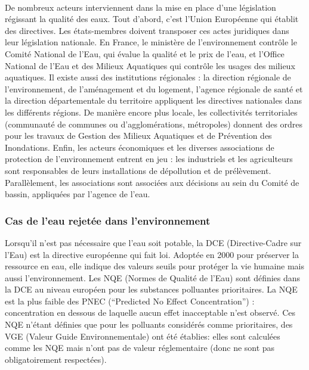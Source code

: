 \documentclass{article}
\begin{document}
\paragraph{} De nombreux acteurs interviennent dans la mise en place d’une législation régissant la qualité des eaux. Tout d’abord, c’est l’Union Européenne qui établit des directives. Les états-membres doivent transposer ces actes juridiques dans leur législation nationale. En France, le  ministère de l’environnement contrôle le Comité National de l’Eau, qui évalue la qualité et le prix de l’eau, et l’Office National de l’Eau et des Milieux Aquatiques  qui contrôle les usages des milieux aquatiques. Il existe aussi des institutions régionales : la direction régionale de l’environnement, de l’aménagement et du logement, l’agence régionale de santé et la direction départementale du territoire  appliquent les directives nationales dans les différents régions. De manière encore plus locale, les collectivités territoriales (communauté de communes ou d’agglomérations, métropoles) donnent des ordres pour les travaux de Gestion des Milieux Aquatiques et de Prévention des Inondations. Enfin, les acteurs économiques et les diverses associations de protection de l’environnement entrent en jeu : les industriels et les agriculteurs sont responsables de leurs installations de dépollution et de prélèvement. Parallèlement, les associations sont associées aux décisions au sein du Comité de bassin, appliquées par l’agence de l’eau.

\subsubsection{Cas de l’eau rejetée dans l’environnement}
Lorsqu’il n’est pas nécessaire que l’eau soit potable, la DCE (Directive-Cadre sur l’Eau) est la directive européenne qui fait loi. Adoptée en 2000 pour préserver la ressource en eau, elle indique des valeurs seuils pour protéger la vie humaine mais aussi l’environnement. Les NQE (Normes de Qualité de l’Eau) sont définies dans la DCE au niveau européen pour les substances polluantes prioritaires. La NQE est la plus faible des PNEC (“Predicted No Effect Concentration”) : concentration en dessous de laquelle aucun effet inacceptable n’est observé. Ces NQE n’étant définies que pour les polluants considérés comme prioritaires, des VGE (Valeur Guide Environnementale) ont été établies: elles sont calculées comme les NQE mais n’ont pas de valeur réglementaire (donc ne sont pas obligatoirement respectées).
\end{document}
